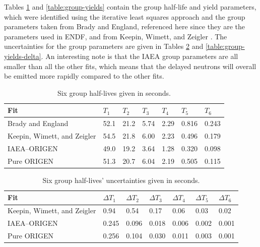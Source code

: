 \documentclass{style/nseJournal}
\begin{document}
Tables \ref{table:half-lives} and \ref{table:group-yields} contain the group half-life and yield parameters, which were identified using the iterative least squares approach and the group parameters taken from Brady and England, referenced here since they are the parameters used in ENDF, and from Keepin, Wimett, and Zeigler \cite{doi:10.13182/NSE103-129, KEEPIN1957IN2}.
The uncertainties for the group parameters are given in Tables \ref{table:half-lives-delta} and \ref{table:group-yields-delta}.
An interesting note is that the IAEA group parameters are all smaller than all the other fits, which means that the delayed neutrons will overall be emitted more rapidly compared to the other fits.

\begin{table}[]
\caption{Six group half-lives given in seconds.}
\centering
\begin{tabular}{|l l l l l l l|} 
 \hline
 Fit & $T_1$ & $T_2$ & $T_3$ & $T_4$ & $T_5$ & $T_6$\\
 \hline\hline
    Brady and England \cite{doi:10.13182/NSE103-129} & 52.1 & 21.2 & 5.74 & 2.29 & 0.816 & 0.243\\
    Keepin, Wimett, and Zeigler \cite{KEEPIN1957IN2} & 54.5 & 21.8 & 6.00 & 2.23 & 0.496 & 0.179 \\
    IAEA--ORIGEN & 49.0 & 19.2 & 3.64 & 1.28 & 0.320 & 0.098 \\
    Pure ORIGEN & 51.3 & 20.7 & 6.04 & 2.19 & 0.505 & 0.115 \\
 \hline
\end{tabular}
\label{table:half-lives}
\end{table}

\begin{table}[]
\caption{Six group half-lives' uncertainties given in seconds.}
\centering
\begin{tabular}{|l l l l l l l|} 
 \hline
 Fit & $\Delta T_1$ & $\Delta T_2$ & $\Delta T_3$ & $\Delta T_4$ & $\Delta T_5$ & $\Delta T_6$\\
 \hline\hline
    Keepin, Wimett, and Zeigler \cite{KEEPIN1957IN2} & 0.94 & 0.54 & 0.17 & 0.06 & 0.03 & 0.02\\
    IAEA--ORIGEN & 0.245 & 0.096 & 0.018 & 0.006 & 0.002 & 0.001 \\
    Pure ORIGEN & 0.256 & 0.104 & 0.030 & 0.011 & 0.003 & 0.001 \\
 \hline
\end{tabular}
\label{table:half-lives-delta}
\end{table}
\end{document}
